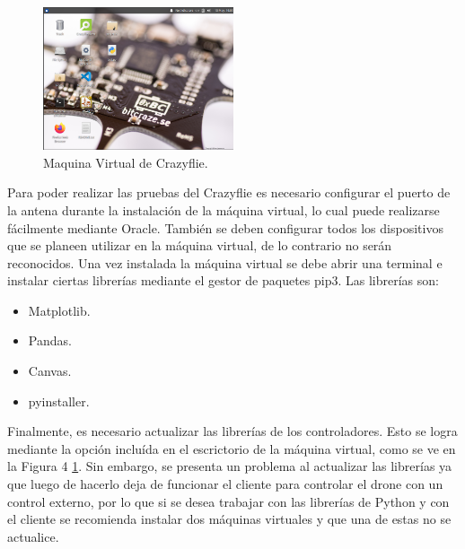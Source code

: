 \begin{figure}[t]
    \centering
    \includegraphics[width=0.5\textwidth]{figuras/VM_Crazyflie.png}
    \caption{Maquina Virtual de Crazyflie.}
    \label{fig:VM}
\end{figure}

Para poder realizar las pruebas del Crazyflie es necesario configurar el puerto de la antena durante la instalación de la máquina virtual, lo cual puede realizarse fácilmente mediante Oracle. También se deben configurar todos los dispositivos que se planeen utilizar en la máquina virtual, de lo contrario no serán reconocidos. Una vez instalada la máquina virtual se debe abrir una terminal e instalar ciertas librerías mediante el gestor de paquetes pip3. Las librerías son:
\begin{itemize}
    \item Matplotlib.
    \item Pandas.
    \item Canvas.
    \item pyinstaller.
\end{itemize}

Finalmente, es necesario actualizar las librerías de los controladores. Esto se logra mediante la opción incluída en el escrictorio de la máquina virtual, como se ve en la Figura 4 \ref{fig:VM}. Sin embargo, se presenta un problema al actualizar las librerías ya que luego de hacerlo deja de funcionar el cliente para controlar el drone con un control externo, por lo que si se desea trabajar con las librerías de Python y con el cliente se recomienda instalar dos máquinas virtuales y que una de estas no se actualice. 

